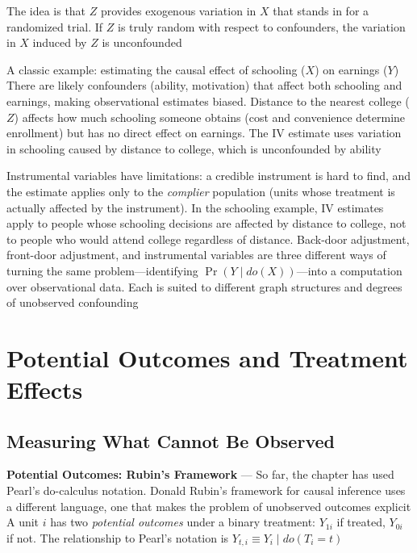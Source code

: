 The idea is that $Z$ provides exogenous variation in $X$ that stands in for a randomized
trial. If $Z$ is truly random with respect to confounders, the variation in $X$ induced
by $Z$ is unconfounded

A classic example: estimating the causal effect of schooling ($X$) on earnings ($Y$)
There are likely confounders (ability, motivation) that affect both schooling
and earnings, making observational estimates biased. Distance to the nearest
college ($Z$) affects how much schooling someone obtains (cost and convenience determine
enrollment) but has no direct effect on earnings. The IV estimate uses variation
in schooling caused by distance to college, which is unconfounded by ability

Instrumental variables have limitations: a credible instrument is hard to find, and
the estimate applies only to the \emph{complier} population (units whose treatment
is actually affected by the instrument). In the schooling example, IV estimates
apply to people whose schooling decisions are affected by distance to college, not
to people who would attend college regardless of distance. Back-door adjustment,
front-door adjustment, and instrumental variables are three different ways of
turning the same problem—identifying $\Pr(Y \mid do(X))$—into a computation over
observational data. Each is suited to different graph structures and degrees of
unobserved confounding

\section{Potential Outcomes and Treatment Effects}
\label{sec:potential-outcomes-treatment-effects}

\subsection{Measuring What Cannot Be Observed}
\label{subsec:measuring-what-cannot-be-observed}

\textbf{Potential Outcomes: Rubin's Framework} --- So far, the chapter has used Pearl's
do-calculus notation. Donald Rubin's framework for causal inference uses a
different language, one that makes the problem of unobserved outcomes explicit A
unit $i$ has two \emph{potential outcomes} under a binary treatment: $Y_{1i}$ if
treated, $Y_{0i}$ if not. The relationship to Pearl's notation is $Y_{t,i}\equiv
Y_{i}\mid do(T_{i}= t)$

